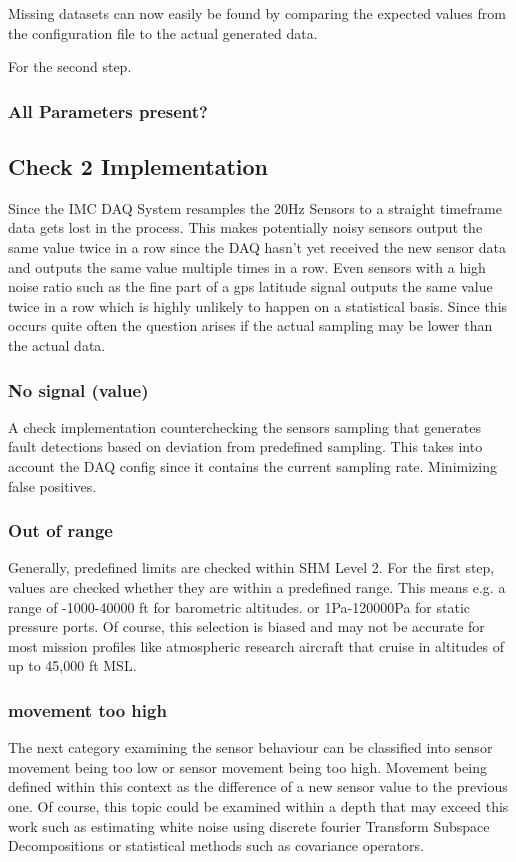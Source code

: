 Missing datasets can now easily be found by comparing the expected values from the configuration file to the actual generated data.

For the second step.

\subsubsection{All Parameters present?}

\subsection{Check 2 Implementation}
Since the IMC DAQ System resamples the 20Hz Sensors to a straight timeframe data gets lost in the process. This makes potentially noisy sensors output the same value twice in a row since the DAQ hasn't yet received the new sensor data and outputs the same value multiple times in a row. Even sensors with a high noise ratio such as the fine part of a gps latitude signal outputs the same value twice in a row which is highly unlikely to happen on a statistical basis. Since this occurs quite often the question arises if the actual sampling may be lower than the actual data.

\subsubsection{ No signal (value)}
A check implementation counterchecking the sensors sampling that generates fault detections based on deviation from predefined sampling. This takes into account the DAQ config since it contains the current sampling rate. Minimizing false positives.

\subsubsection{Out of range}
Generally, predefined limits are checked within SHM Level 2. For the first step, values are checked whether they are within a predefined range. This means e.g. a range of -1000-40000 ft for barometric altitudes. or 1Pa-120000Pa for static pressure ports. Of course, this selection is biased and may not be accurate for most mission profiles like atmospheric research aircraft that cruise in altitudes of up to 45,000 ft MSL.

\subsubsection{movement too high}
The next category examining the sensor behaviour can be classified into sensor movement being too low or sensor movement being too high. Movement being defined within this context as the difference of a new sensor value to the previous one. Of course, this topic could be examined within a depth that may exceed this work such as estimating white noise using discrete fourier Transform Subspace Decompositions \cite{hendriks_noise_2008} or statistical methods such as covariance operators.

